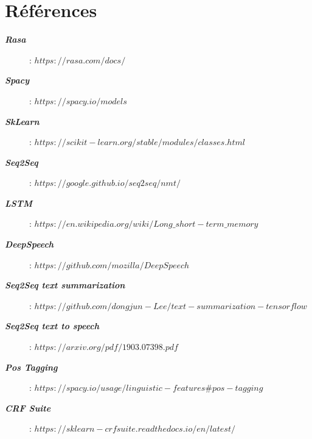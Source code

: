 
\part{Références}

\newcommand{\reff}[2]{\item[\textbf{\textit{#1}}]: \textit{#2}}

\begin{description}
\reff{Rasa}{$https://rasa.com/docs/$}
\reff{Spacy}{$https://spacy.io/models$}
\reff{SkLearn}{$https://scikit-learn.org/stable/modules/classes.html$}
\reff{Seq2Seq}{$https://google.github.io/seq2seq/nmt/$}
\reff{LSTM}{$https://en.wikipedia.org/wiki/Long\_short-term\_memory$}
\reff{DeepSpeech}{$https://github.com/mozilla/DeepSpeech$}
\reff{Seq2Seq text summarization}{$https://github.com/dongjun-Lee/text-summarization-tensorflow$}
\reff{Seq2Seq text to speech}{$https://arxiv.org/pdf/1903.07398.pdf$}
\reff{Pos Tagging}{$https://spacy.io/usage/linguistic-features\#pos-tagging$}
\reff{CRF Suite}{$https://sklearn-crfsuite.readthedocs.io/en/latest/$}
\end{description}

	
	